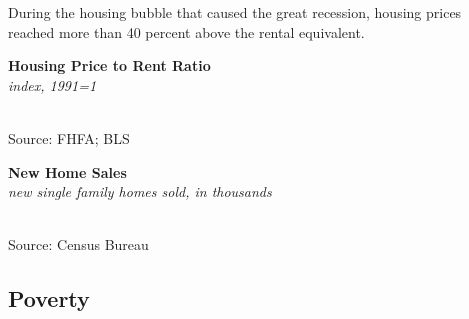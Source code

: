 \documentclass{report}
\makeatletter
\newcommand{\tbllink}[1]{\href{https://raw.githubusercontent.com/bdecon/US-chartbook/master/chartbook/data/#1}{\faTable}}
\newcommand*\short[1]{\expandafter\@gobbletwo\number\numexpr#1\relax}
\newcommand{\dateaxisticks}{
		date coordinates in=x, axis line style={draw=none},
		xmax={2021-06-15},
		max space between ticks=40,	    
		xtick={{1990-01-01}, {1992-01-01}, {1994-01-01}, 
			{1996-01-01}, {1998-01-01}, {2000-01-01}, 
			{2002-01-01}, {2004-01-01}, {2006-01-01},
			{2008-01-01}, {2010-01-01}, {2012-01-01}, {2014-01-01},
		    {2016-01-01}, {2018-01-01}, {2020-01-01}},
		minor xtick={{1989-01-01}, {1991-01-01}, {1993-01-01},
			{1995-01-01}, {1997-01-01}, {1999-01-01}, 
			{2001-01-01}, {2003-01-01}, {2005-01-01}, {2007-01-01},
		    {2009-01-01}, {2011-01-01}, {2013-01-01}, {2015-01-01},
		    {2017-01-01}, {2019-01-01}, {2021-01-01}},
		enlarge y limits={0.06}, enlarge x limits={0.01},
		}
\newcommand{\shdateaxisticks}{
		date coordinates in=x, axis line style={draw=none},
		xmax={2021-06-15},
		max space between ticks=40,	    
		xtick={{1990-01-01}, {1995-01-01}, {2000-01-01}, 
			{2005-01-01}, {2010-01-01}, {2015-01-01}, {2020-01-01}},
		minor xtick={},
		enlarge y limits={0.06}, enlarge x limits={0.01},
		}
\newcommand{\bbar}[2]{extra #1 ticks = {{#2}}, extra #1 tick labels = ,
		extra #1 tick style = {grid=major, grid style={thick, black!25}},}
\newcommand{\stdline}[4]{\addplot[very thick, no markers, color=#1] 
		table [x=#2, y=#3, col sep=comma] {#4};	}
\newcommand{\rbars}{
		\fill[color=black!10] (axis cs:{1990-07-01},\pgfkeysvalueof{/pgfplots/ymin}) rectangle 
			(axis cs:{1991-03-01}, \pgfkeysvalueof{/pgfplots/ymax});
		\fill[color=black!10] (axis cs:{2007-12-01},\pgfkeysvalueof{/pgfplots/ymin}) rectangle 
			(axis cs:{2009-07-01}, \pgfkeysvalueof{/pgfplots/ymax});
		\fill[color=black!10] (axis cs:{2001-03-01},\pgfkeysvalueof{/pgfplots/ymin}) rectangle 
			(axis cs:{2001-11-01}, \pgfkeysvalueof{/pgfplots/ymax});
		\fill[color=black!10] (axis cs:{2020-02-01},\pgfkeysvalueof{/pgfplots/ymin}) rectangle 
			(axis cs:{2021-06-15}, \pgfkeysvalueof{/pgfplots/ymax});}
\newcommand{\rebars}{
		\fill[color=black!10] (axis cs:{2007-12-01},\pgfkeysvalueof{/pgfplots/ymin}) rectangle 
			(axis cs:{2009-07-01}, \pgfkeysvalueof{/pgfplots/ymax});
		\fill[color=black!10] (axis cs:{2001-03-01},\pgfkeysvalueof{/pgfplots/ymin}) rectangle 
			(axis cs:{2001-11-01}, \pgfkeysvalueof{/pgfplots/ymax});
		\fill[color=black!10] (axis cs:{2020-02-01},\pgfkeysvalueof{/pgfplots/ymin}) rectangle 
			(axis cs:{2021-06-15}, \pgfkeysvalueof{/pgfplots/ymax});}
\makeatother
\begin{document}
{\begin{minipage}{0.33\textwidth}
During the housing bubble that caused the great recession, housing prices reached more than 40 percent above the rental equivalent. 
\end{minipage}\hspace{8mm}
\begin{minipage}{0.37\textwidth}
\normalsize \textbf{Housing Price to Rent Ratio}\\
\footnotesize{\textit{index, 1991=1}}\\
\hspace*{-2mm} \\
\footnotesize{Source: FHFA; BLS} \hfill \tbllink{hpi_rent_ratio.csv} 

\end{minipage}
\newpage
\begin{minipage}{0.76\textwidth}
\small 
\vspace{1mm}

\normalsize{\textbf{New Home Sales}}\\
\footnotesize{\textit{new single family homes sold, in thousands}}\\
\hspace*{-2mm} \\
\footnotesize{Source: Census Bureau} \hfill \tbllink{nhs.csv}
\end{minipage}
\newpage
\subsection*{\color{black!70} \seriffont Poverty}
\begin{minipage}{0.76\textwidth}
\small 


\end{minipage}}
\end{document}
